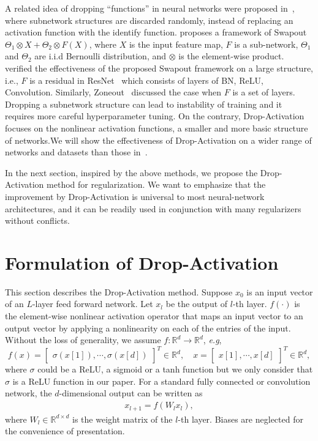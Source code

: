 \documentclass[11pt]{article}
\def\eg{\emph{e.g}}
\begin{document}
A related idea of dropping ``functions'' in neural networks were proposed in~\cite{swapout, zoneout}, where subnetwork structures are discarded randomly, instead of replacing an activation function with the identify function. \cite{swapout} proposes a framework of Swapout $\Theta_1 \otimes X + \Theta_2\otimes F(X)$, where $X$ is the input feature map, $F$ is a sub-network, $\Theta_1$ and $\Theta_2$ are i.i.d Bernoulli distribution, and $\otimes$ is the element-wise product. \cite{swapout} verified the effectiveness of the proposed Swapout framework on a large structure, i.e., $F$ is a residual in ResNet~\cite{resnet} which consists of layers of BN, ReLU, Convolution. Similarly, Zoneout~\cite{zoneout} discussed the case when $F$ is a set of layers. Dropping a subnetwork structure can lead to instability of training and it requires more careful hyperparameter tuning. On the contrary, Drop-Activation focuses on the nonlinear activation functions, a smaller and more basic structure of networks.We will show the effectiveness of Drop-Activation on a wider range of networks and datasets than those in~\cite{swapout, zoneout}.

In the next section, inspired by the above methods, we propose the Drop-Activation method for regularization. We want to emphasize that the improvement by Drop-Activation is universal to most neural-network architectures, and it can be readily used in conjunction with many regularizers without conflicts.

\section{Formulation of Drop-Activation}
\label{sec:3}
This section describes the Drop-Activation method. Suppose $x_0$ is an input vector of an $L$-layer feed forward network. Let $x_l$ be the output of $l$-th layer. $f(\cdot)$ is the element-wise nonlinear activation operator that maps an input vector to an output vector by applying a nonlinearity on each of the entries of the input. Without the loss of generality, we assume $f:\mathbb{R}^d\rightarrow \mathbb{R}^d$, \eg,
\begin{equation}
f(x) = \begin{bmatrix} \sigma\left(x[1]\right), \cdots,  \sigma\left(x[d]\right) \end{bmatrix}^T\in \mathbb{R}^d, \quad x = \begin{bmatrix} x[1] , \cdots, x[d] \end{bmatrix}^T\in \mathbb{R}^d,
\end{equation}
where $\sigma$ could be a ReLU, a sigmoid or a tanh function but we only consider that $\sigma$ is a ReLU function in our paper. For a standard fully connected or convolution network, the $d$-dimensional output can be written as
\begin{align}
x_{l+1} = f(W_lx_l),
\label{eq:output-L}
\end{align}
where $W_l\in \mathbb{R}^{d\times d}$ is the weight matrix of the $l$-th layer. Biases are neglected for the convenience of presentation.
\end{document}
